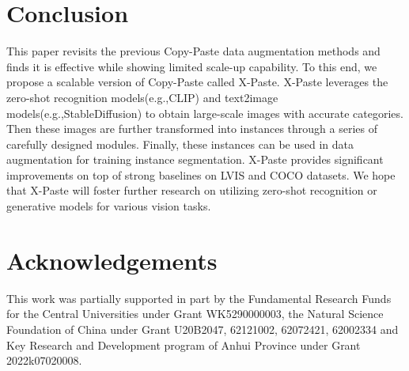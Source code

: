 \documentclass{article}
\newcommand{\eg}{e.g.,}
\begin{document}
\begin{table}[t]
  \small
  \centering
\caption{X-paste works well across a variety of different model architectures on the COCO dataset.}
\label{tab:COCO1}
\end{table}


\section{Conclusion}
This paper revisits the previous Copy-Paste data augmentation methods and finds it is effective while showing limited scale-up capability. To this end, we propose a scalable version of Copy-Paste called X-Paste. X-Paste leverages the zero-shot recognition models(\eg CLIP) and text2image models(\eg StableDiffusion) to obtain large-scale images with accurate categories. Then these images are further transformed into instances through a series of carefully designed modules. Finally, these instances can be used in data augmentation for training instance segmentation. X-Paste provides significant improvements on top of strong baselines on LVIS and COCO datasets. We hope that X-Paste will foster further research on utilizing zero-shot recognition or generative models for various vision tasks.

\section{Acknowledgements}
This work was partially supported in part by the Fundamental Research Funds for the Central Universities under Grant WK5290000003, the Natural Science Foundation of China under Grant U20B2047, 62121002, 62072421, 62002334 and Key Research and Development program of Anhui Province under Grant 2022k07020008. 



\end{document}
